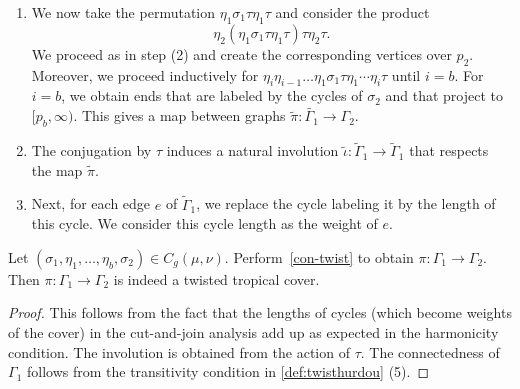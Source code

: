 \documentclass[ALCO,published]{cedram}
\begin{document}
\begin{construction}
\begin{enumerate}
\begin{enumerate}
\begin{figure}[H]
{}
        \end{figure}

    \end{enumerate}
    In each case, we further extend all ends not attached to a vertex over $p_1$ to~$[p_1,p_2]$.
    \item We now take the permutation $\eta_1\sigma_1\tau\eta_1\tau$ and consider the product
    \begin{equation*}
        \eta_2(\eta_1\sigma_1\tau\eta_1\tau)\tau\eta_2\tau.
    \end{equation*}
    We proceed as in step (2) and create the corresponding vertices over $p_2$. Moreover, we proceed inductively for $\eta_i\eta_{i-1}\dots\eta_1\sigma_1\tau\eta_1\cdots\eta_i\tau$ until $i=b$. For $i=b$, we obtain ends that are labeled by the cycles of $\sigma_2$ and that project to $[p_b,\infty)$. This gives a map between graphs $\tilde{\pi}\colon\tilde{\Gamma_1}\to\Gamma_2$.
    \item The conjugation by $\tau$ induces a natural involution $
    \tilde{\iota}\colon\tilde{\Gamma}_1\to\tilde{\Gamma}_1$ that respects the map $\tilde{\pi}$.
    \item Next, for each edge $e$ of $\tilde{\Gamma}_1$, we replace the cycle labeling it by the length of this cycle. We consider this cycle length as the weight of $e$. 
\end{enumerate}
\end{construction}

\begin{lemma}\label{lem-outcomeconstruction}
Let $(\sigma_1,
\eta_1,\dots,\eta_b,\sigma_2)\in C_g(\mu,\nu)$. Perform~\cref{con-twist} to obtain $\pi\colon\Gamma_1\to\Gamma_2$. Then $\pi\colon\Gamma_1\to\Gamma_2$ is indeed a twisted tropical cover.
    \end{lemma}

\begin{proof}
    This follows from the fact that the lengths of cycles (which become weights of the cover) in the cut-and-join analysis add up as expected in the harmonicity condition. The involution is obtained from the action of $\tau$. The connectedness of $\Gamma_1$ follows from the transitivity condition in \cref{def:twisthurdou} (5).
\end{proof}
\end{document}
